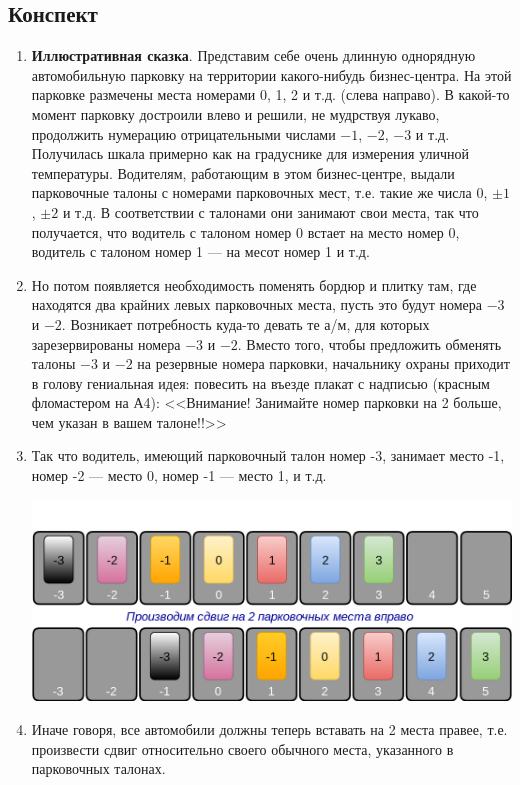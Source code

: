 \subsection*{Конспект}
\begin{enumerate}\setlength{\itemsep}{1pt}
\item \textbf{Иллюстративная сказка}. Представим себе очень длинную однорядную автомобильную парковку на территории какого-нибудь бизнес-центра. На этой парковке размечены места номерами 0, 1, 2 и т.д. (слева направо). В какой-то момент парковку достроили влево и решили, не мудрствуя лукаво, продолжить нумерацию отрицательными числами $-1$, $-2$, $-3$ и т.д. Получилась шкала примерно как на градуснике для измерения уличной температуры. Водителям, работающим в этом бизнес-центре, выдали парковочные талоны с номерами парковочных мест, т.е. такие же числа 0, $\pm 1$, $\pm 2$ и т.д. В соответствии с талонами они занимают свои места, так что получается, что водитель с талоном номер 0 встает на место номер 0, водитель с талоном номер 1 --- на месот номер 1 и т.д.
\item Но потом появляется необходимость поменять бордюр и плитку там, где находятся два крайних левых парковочных места, пусть это будут номера $-3$ и $-2$. Возникает потребность куда-то девать те а/м, для которых зарезервированы номера $-3$ и $-2$. Вместо того, чтобы предложить обменять талоны $-3$ и $-2$ на резервные номера парковки, начальнику охраны приходит в голову гениальная идея: повесить на въезде плакат с надписью (красным фломастером на А4): <<Внимание! Занимайте номер парковки на 2 больше, чем указан в вашем талоне!!>>
\item Так что водитель, имеющий парковочный талон номер -3, занимает место -1, номер -2 --- место 0, номер -1 --- место 1, и т.д.
\begin{center}
\includegraphics[scale=0.6]{TT.png}
\end{center}
\item Иначе говоря, все автомобили должны теперь вставать на 2 места правее, т.е. произвести сдвиг относительно своего обычного места, указанного в парковочных талонах.

\end{enumerate}
